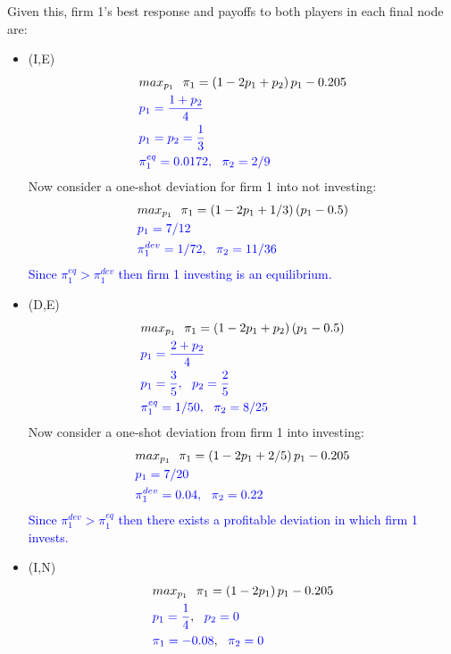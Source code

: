 \documentclass[12pt,english]{article}
\begin{document}
\begin{enumerate}
\begin{enumerate}
Given this, firm 1's best response and payoffs to both players in each final node are:

\begin{itemize}
\item (I,E)
\begin{align}
&max_{p_{1}}\ \ \pi_{1}=\left(1-2p_{1}+p_{2}\right)p_{1}-0.205\nonumber\\
&\textcolor{blue}{p_{1}=\frac{1+p_{2}}{4}}\nonumber\\
&\textcolor{blue}{p_{1}=p_{2}=\frac{1}{3}}\nonumber\\
&\textcolor{blue}{\pi^{eq}_{1}=0.0172,\ \ \pi_{2}=2/9}\nonumber
\end{align}
Now consider a one-shot deviation for firm 1 into not investing:
\begin{align}
&max_{p_{1}}\ \ \pi_{1}=\left(1-2p_{1}+1/3\right)(p_{1}-0.5)\nonumber\\
&\textcolor{blue}{p_{1}=7/12}\nonumber\\
&\textcolor{blue}{\pi^{dev}_{1}=1/72,\ \ \pi_{2}=11/36}\nonumber
\end{align}
\textcolor{blue}{Since $\pi^{eq}_{1}>\pi^{dev}_{1}$ then firm 1 investing is an equilibrium.}


\item (D,E)
\begin{align}
&max_{p_{1}}\ \ \pi_{1}=\left(1-2p_{1}+p_{2}\right)(p_{1}-0.5)\nonumber\\
&\textcolor{blue}{p_{1}=\frac{2+p_{2}}{4}}\nonumber\\
&\textcolor{blue}{p_{1}=\frac{3}{5},\ \ p_{2}=\frac{2}{5}}\nonumber\\
&\textcolor{blue}{\pi^{eq}_{1}=1/50,\ \ \pi_{2}=8/25}\nonumber
\end{align}
Now consider a one-shot deviation from firm 1 into investing:
\begin{align}
&max_{p_{1}}\ \ \pi_{1}=\left(1-2p_{1}+2/5\right)p_{1}-0.205\nonumber\\
&\textcolor{blue}{p_{1}=7/20}\nonumber\\
&\textcolor{blue}{\pi^{dev}_{1}=0.04,\ \ \pi_{2}=0.22}\nonumber
\end{align}
\textcolor{blue}{Since $\pi^{dev}_{1}>\pi^{eq}_{1}$ then there exists a profitable deviation in which firm 1 invests.}


\item (I,N)
\begin{align}
&max_{p_{1}}\ \ \pi_{1}=\left(1-2p_{1}\right)p_{1}-0.205\nonumber\\
&\textcolor{blue}{p_{1}=\frac{1}{4}}, \ \ \textcolor{blue}{p_{2}=0}\nonumber\\
& \textcolor{blue}{\pi_{1}=-0.08}, \ \ \textcolor{blue}{\pi_{2}=0}\nonumber
\end{align}


\end{itemize}
\end{enumerate}
\end{enumerate}
\end{document}
